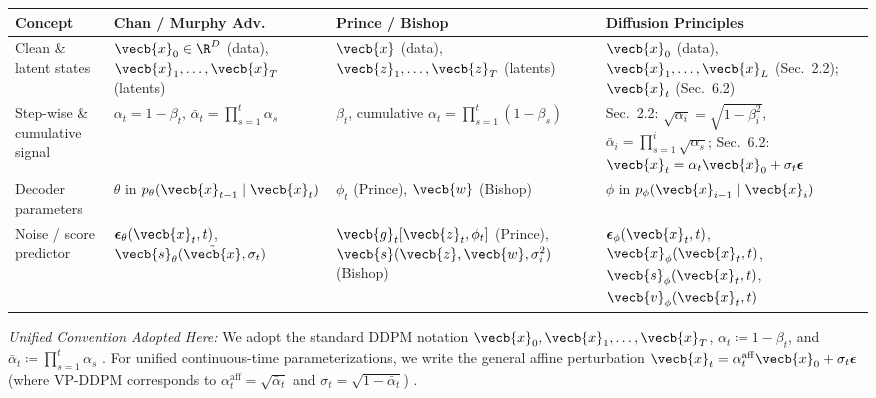 \documentclass[../../../../master.tex]{subfiles}
\begin{document}
\begin{crossbook}
\label{tab:ddpm:notation}
\small
\begin{tabularx}{\textwidth}{@{}l >{\raggedright\arraybackslash}X >{\raggedright\arraybackslash}X >{\raggedright\arraybackslash}X@{}}
\toprule
\textbf{Concept} & \textbf{Chan / Murphy Adv.} & \textbf{Prince / Bishop} & \textbf{Diffusion Principles} \\
\midrule
Clean \& latent states &
  $\vecb{x}_0 \in \R^D$ (data), $\vecb{x}_1,\dots,\vecb{x}_T$ (latents) &
  $\vecb{x}$ (data), $\vecb{z}_1,\dots,\vecb{z}_T$ (latents) &
  $\vecb{x}_0$ (data), $\vecb{x}_1,\dots,\vecb{x}_L$ (Sec.~2.2); $\vecb{x}_t$ (Sec.~6.2) \\
\addlinespace[3pt]
Step-wise \& cumulative signal &
  $\alpha_t = 1-\beta_t$, $\bar{\alpha}_t = \prod_{s=1}^t \alpha_s$ &
  $\beta_t$, cumulative $\alpha_t = \prod_{s=1}^t (1-\beta_s)$ &
  Sec.~2.2: $\sqrt{\alpha_i}=\sqrt{1-\beta_i^2}$, $\bar{\alpha}_i=\prod_{s=1}^i \sqrt{\alpha_s}$; Sec.~6.2: $\vecb{x}_t=\alpha_t\vecb{x}_0+\sigma_t\boldsymbol{\epsilon}$ \\
\addlinespace[3pt]
Decoder parameters &
  $\theta$ in $p_\theta(\vecb{x}_{t-1}\mid\vecb{x}_t)$ &
  $\phi_t$ (Prince), $\vecb{w}$ (Bishop) &
  $\phi$ in $p_\phi(\vecb{x}_{i-1}\mid\vecb{x}_i)$ \\
\addlinespace[3pt]
Noise / score predictor &
  $\boldsymbol{\epsilon}_\theta(\vecb{x}_t, t)$, $\vecb{s}_\theta(\tilde{\vecb{x}}, \sigma_t)$ &
  $\vecb{g}_t[\vecb{z}_t, \phi_t]$ (Prince), $\vecb{s}(\vecb{z}, \vecb{w}, \sigma_i^2)$ (Bishop) &
  $\boldsymbol{\epsilon}_\phi(\vecb{x}_t, t)$, $\vecb{x}_\phi(\vecb{x}_t, t)$, $\vecb{s}_\phi(\vecb{x}_t, t)$, $\vecb{v}_\phi(\vecb{x}_t, t)$ \\
\bottomrule
\end{tabularx}
\vspace{4pt}
\footnotesize\emph{Unified Convention Adopted Here:} We adopt the standard DDPM notation $\vecb{x}_0, \vecb{x}_1, \dots, \vecb{x}_T$, $\alpha_t \coloneqq 1 - \beta_t$, and $\bar{\alpha}_t \coloneqq \prod_{s=1}^t \alpha_s$  . For unified continuous-time parameterizations, we write the general affine perturbation $\vecb{x}_t = \alpha_t^{\mathrm{aff}} \vecb{x}_0 + \sigma_t \boldsymbol{\epsilon}$ (where VP-DDPM corresponds to $\alpha_t^{\mathrm{aff}} = \sqrt{\bar{\alpha}_t}$ and $\sigma_t = \sqrt{1 - \bar{\alpha}_t}$) .
\end{crossbook}
\end{document}
